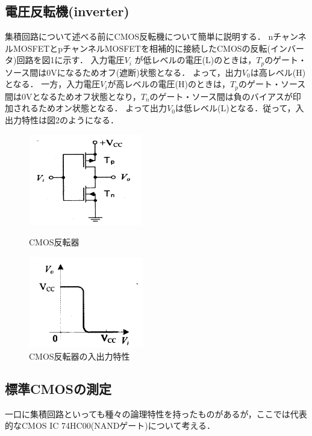 \documentclass[10pt, a4j, dvipdfmx]{jarticle}
\begin{document}
\subsection*{電圧反転機(inverter)}
集積回路について述べる前にCMOS反転機について簡単に説明する．
nチャンネルMOSFETとpチャンネルMOSFETを相補的に接続したCMOSの反転(インバータ)回路を図1に示す．
入力電圧$V_i$ が低レベルの電圧(L)のときは，$T_p$のゲート・ソース間は0Vになるためオフ(遮断)状態となる．
よって，出力$V_0$は高レベル(H)となる．
一方，入力電圧$V_i$が高レベルの電圧(H)のときは，$T_p$のゲート・ソース 間は0Vとなるためオフ状態となり，$T_n$のゲート・ソース間は負のバイアスが印加されるためオン状態となる．
よって出力$V_0$は低レベル(L)となる．従って，入出力特性は図2のようになる．
\begin{figure}[H]
  \begin{minipage}{0.5\hsize}
    \centering
    \includegraphics[height=40mm]{実験テキスト/図1.png}
    \caption{CMOS反転器}
  \end{minipage}
  \begin{minipage}{0.5\hsize}
    \centering
    \includegraphics[height=40mm]{実験テキスト/図2.png}
    \caption{CMOS反転器の入出力特性}
  \end{minipage}
\end{figure}

\subsection*{標準CMOSの測定}
一口に集積回路といっても種々の論理特性を持ったものがあるが，ここでは代表的なCMOS IC 74HC00(NANDゲート)について考える．
\end{document}

